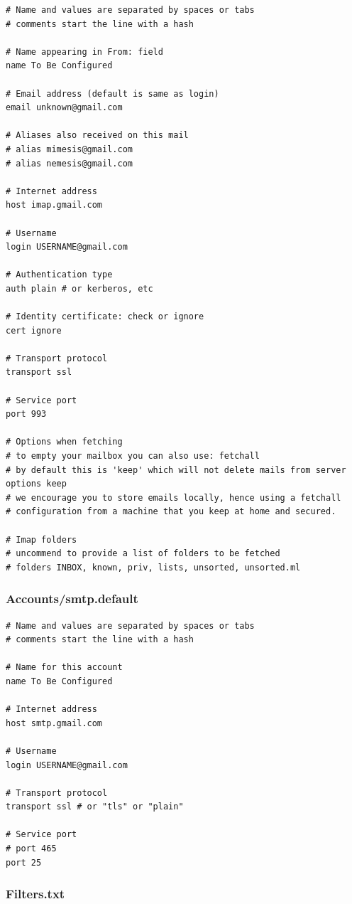\documentclass[a4,onecolumn,portrait]{article}
\begin{document}
\begin{verbatim}
# Name and values are separated by spaces or tabs
# comments start the line with a hash

# Name appearing in From: field
name To Be Configured

# Email address (default is same as login)
email unknown@gmail.com

# Aliases also received on this mail
# alias mimesis@gmail.com
# alias nemesis@gmail.com

# Internet address
host imap.gmail.com

# Username
login USERNAME@gmail.com

# Authentication type
auth plain # or kerberos, etc

# Identity certificate: check or ignore
cert ignore

# Transport protocol
transport ssl

# Service port
port 993

# Options when fetching
# to empty your mailbox you can also use: fetchall
# by default this is 'keep' which will not delete mails from server
options keep
# we encourage you to store emails locally, hence using a fetchall
# configuration from a machine that you keep at home and secured.

# Imap folders
# uncommend to provide a list of folders to be fetched
# folders INBOX, known, priv, lists, unsorted, unsorted.ml
\end{verbatim}
\subsubsection{Accounts/smtp.default}
\label{sec-12-1-2}

\begin{verbatim}
# Name and values are separated by spaces or tabs
# comments start the line with a hash

# Name for this account
name To Be Configured

# Internet address
host smtp.gmail.com

# Username
login USERNAME@gmail.com

# Transport protocol
transport ssl # or "tls" or "plain"

# Service port
# port 465
port 25
\end{verbatim}
\subsubsection{Filters.txt}
\label{sec-12-1-3}
\end{document}
